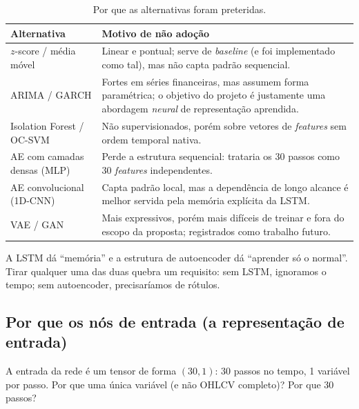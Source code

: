 \begin{table}[h]
\centering
\caption{Por que as alternativas foram preteridas.}
\label{tab:alternativas}
\renewcommand{\arraystretch}{1.2}
\begin{tabular}{p{4.2cm} p{9.5cm}}
\toprule
\textbf{Alternativa} & \textbf{Motivo de não adoção} \\
\midrule
$z$-score / média móvel & Linear e pontual; serve de \emph{baseline} (e foi
implementado como tal), mas não capta padrão sequencial. \\
ARIMA / GARCH & Fortes em séries financeiras, mas assumem forma paramétrica;
o objetivo do projeto é justamente uma abordagem \emph{neural} de representação aprendida. \\
Isolation Forest / OC-SVM & Não supervisionados, porém sobre vetores de
\emph{features} sem ordem temporal nativa. \\
AE com camadas densas (MLP) & Perde a estrutura sequencial: trataria os 30 passos
como 30 \emph{features} independentes. \\
AE convolucional (1D-CNN) & Capta padrão local, mas a dependência de longo alcance
é melhor servida pela memória explícita da LSTM. \\
VAE / GAN & Mais expressivos, porém mais difíceis de treinar e fora do escopo da
proposta; registrados como trabalho futuro. \\
\bottomrule
\end{tabular}
\end{table}

\begin{intuicao}
A LSTM dá ``memória'' e a estrutura de autoencoder dá ``aprender só o normal''.
Tirar qualquer uma das duas quebra um requisito: sem LSTM, ignoramos o tempo;
sem autoencoder, precisaríamos de rótulos.
\end{intuicao}

\subsection{Por que os nós de entrada (a representação de entrada)}
\label{sec:debate-arq-input}

\begin{confronto}
A entrada da rede é um tensor de forma $(30, 1)$: 30 passos no tempo, 1 variável
por passo. Por que uma única variável (e não OHLCV completo)? Por que 30 passos?
\end{confronto}

